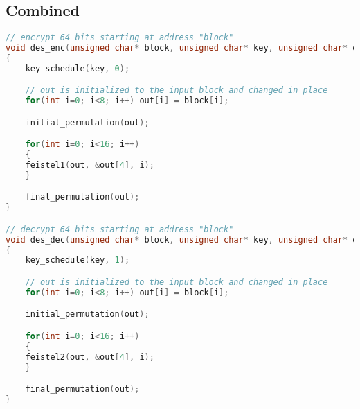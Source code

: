 \documentclass{article}
\begin{document}
\subsection{Combined}
\begin{lstlisting}[language=c]
// encrypt 64 bits starting at address "block"
void des_enc(unsigned char* block, unsigned char* key, unsigned char* out)
{
    key_schedule(key, 0);

    // out is initialized to the input block and changed in place
    for(int i=0; i<8; i++) out[i] = block[i]; 

    initial_permutation(out);

    for(int i=0; i<16; i++)
    {
	feistel1(out, &out[4], i);
    }

    final_permutation(out);
}

// decrypt 64 bits starting at address "block"
void des_dec(unsigned char* block, unsigned char* key, unsigned char* out)
{
    key_schedule(key, 1);

    // out is initialized to the input block and changed in place
    for(int i=0; i<8; i++) out[i] = block[i];

    initial_permutation(out);

    for(int i=0; i<16; i++)
    {
	feistel2(out, &out[4], i);
    }

    final_permutation(out);
}
\end{lstlisting}
\end{document}
